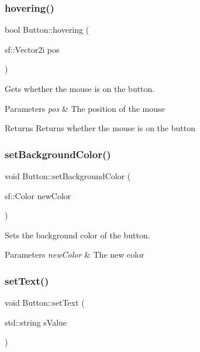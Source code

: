 \subsubsection{\texorpdfstring{hovering()}{hovering()}}
{\footnotesize\ttfamily bool Button\+::hovering (\begin{DoxyParamCaption}\item[{sf\+::\+Vector2i}]{pos }\end{DoxyParamCaption})}



Gets whether the mouse is on the button. 


\begin{DoxyParams}{Parameters}
{\em pos} & The position of the mouse \\
\hline
\end{DoxyParams}
\begin{DoxyReturn}{Returns}
Returns whether the mouse is on the button 
\end{DoxyReturn}
\mbox{\label{class_button_a44d606edb40d3bbf9140028b7fec95f4}} 
\subsubsection{\texorpdfstring{set\+Background\+Color()}{setBackgroundColor()}}
{\footnotesize\ttfamily void Button\+::set\+Background\+Color (\begin{DoxyParamCaption}\item[{sf\+::\+Color}]{new\+Color }\end{DoxyParamCaption})}



Sets the background color of the button. 


\begin{DoxyParams}{Parameters}
{\em new\+Color} & The new color \\
\hline
\end{DoxyParams}
\mbox{\label{class_button_adff79b7f37511a8ecd21921c13e1b0be}} 
\subsubsection{\texorpdfstring{set\+Text()}{setText()}}
{\footnotesize\ttfamily void Button\+::set\+Text (\begin{DoxyParamCaption}\item[{std\+::string}]{s\+Value }\end{DoxyParamCaption})}



